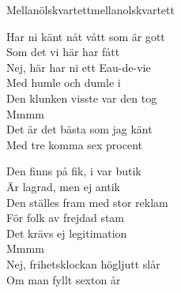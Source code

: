 \begin{song}{Mellanölskvartett}{mellanolskvartett}
\begin{vers}
Har ni känt nåt vått som är gott\\
Som det vi här har fått\\
Nej, här har ni ett Eau-de-vie\\
Med humle och dumle i\\
Den klunken visste var den tog\\
Mmmm\\
Det är det bästa som jag känt\\
Med tre komma sex procent\\
\end{vers}
\begin{vers}
Den finns på fik, i var butik\\
Är lagrad, men ej antik\\
Den ställes fram med stor reklam\\
För folk av frejdad stam\\
Det krävs ej legitimation\\
Mmmm\\
Nej, frihetsklockan högljutt slår\\
Om man fyllt sexton år\\
\end{vers}
\end{song}

